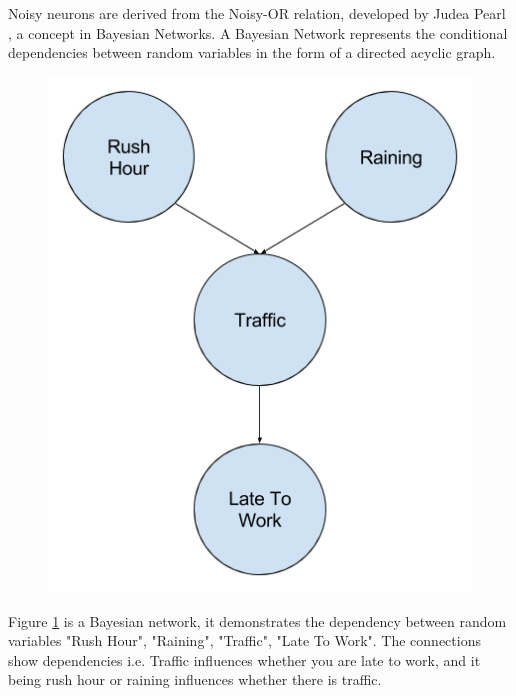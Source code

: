 Noisy neurons are derived from the Noisy-OR relation\cite{LearningLogicalActivations}, developed by Judea Pearl \cite{russell1995modern}, a concept in Bayesian Networks. A Bayesian Network represents the conditional dependencies between random variables in the form of a directed acyclic graph.

\begin{figure}[H]
  \centering
  \begin{minipage}[b]{0.4\textwidth}
    \includegraphics[width=\textwidth]{bayesian-network-example.png}
    \caption{}
    \label{fig:bayesian-network-example}
  \end{minipage}
  \hfill
\end{figure}

Figure \ref{fig:bayesian-network-example} is a Bayesian network, it demonstrates the dependency between random variables "Rush Hour", "Raining", "Traffic", "Late To Work". The connections show dependencies i.e. Traffic influences whether you are late to work, and it being rush hour or raining influences whether there is traffic.\\

